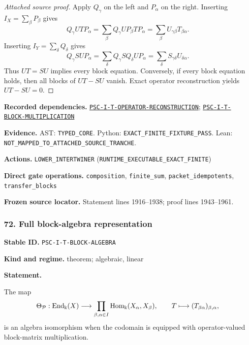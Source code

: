 \documentclass[a4paper,11pt]{article}
\newcommand{\bbk}{\Bbbk}\newcommand{\A}{\mathcal A}\newcommand{\B}{\mathcal B}\newcommand{\Ccal}{\mathcal C}\newcommand{\Pcal}{\mathcal P}\newcommand{\Qcal}{\mathcal Q}\newcommand{\Rcal}{\mathcal R}\newcommand{\Scal}{\mathcal S}
\newcommand{\field}[2]{\noindent\textbf{#1.} #2\par}
\begin{document}
\begin{proof}[Attached source proof]
Apply \(Q_\gamma\) on the left and \(P_\alpha\) on the right.  Inserting \(I_X=\sum_\beta P_\beta\) gives
\[
Q_\gamma UTP_\alpha
=
\sum_\beta Q_\gamma UP_\beta TP_\alpha
=
\sum_\beta U_{\gamma\beta}T_{\beta\alpha}.
\]
Inserting \(I_Y=\sum_\delta Q_\delta\) gives
\[
Q_\gamma SUP_\alpha
=
\sum_\delta Q_\gamma SQ_\delta UP_\alpha
=
\sum_\delta S_{\gamma\delta}U_{\delta\alpha}.
\]
Thus \(UT=SU\) implies every block equation.  Conversely, if every block equation holds, then all blocks of \(UT-SU\) vanish.  Exact operator reconstruction yields \(UT-SU=0\).
\end{proof}
\field{Recorded dependencies}{\hyperref[rec:PSC-I-T-OPERATOR-RECONSTRUCTION]{\nolinkurl{PSC-I-T-OPERATOR-RECONSTRUCTION}}; \hyperref[rec:PSC-I-T-BLOCK-MULTIPLICATION]{\nolinkurl{PSC-I-T-BLOCK-MULTIPLICATION}}}
\field{Evidence}{AST: \nolinkurl{TYPED_CORE}. Python: \nolinkurl{EXACT_FINITE_FIXTURE_PASS}. Lean: \nolinkurl{NOT_MAPPED_TO_ATTACHED_SOURCE_TRANCHE}.}
\field{Actions}{\nolinkurl{LOWER_INTERTWINER} (\nolinkurl{RUNTIME_EXECUTABLE_EXACT_FINITE})}
\field{Direct gate operations}{\nolinkurl{composition}, \nolinkurl{finite_sum}, \nolinkurl{packet_idempotents}, \nolinkurl{transfer_blocks}}
\field{Frozen source locator}{Statement lines 1916--1938; proof lines 1943--1961.}
\subsubsection*{72. Full block-algebra representation}
\label{rec:PSC-I-T-BLOCK-ALGEBRA}
\field{Stable ID}{\nolinkurl{PSC-I-T-BLOCK-ALGEBRA}}
\field{Kind and regime}{theorem; algebraic, linear}
\textbf{Statement.}\par
The map
\[
\Theta_{\Pcal}:\End_{\bbk}(X)
\longrightarrow
\prod_{\beta,\alpha\in I}\Hom_{\bbk}(X_\alpha,X_\beta),
\qquad
T\longmapsto(T_{\beta\alpha})_{\beta,\alpha},
\]
is an algebra isomorphism when the codomain is equipped with operator-valued block-matrix multiplication.
\end{document}

